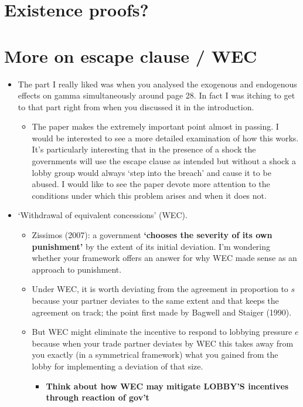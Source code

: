 \documentclass[12pt]{article}
\begin{document}
\section{Existence proofs?}


\section{More on escape clause / WEC}
		\begin{itemize}
			\item The part I really liked was when you analysed the exogenous and endogenous effects on gamma simultaneously around page 28.  In fact I was itching to get to that part right from when you discussed it in the introduction.  
				\begin{itemize}
					\item The paper makes the extremely important point almost in passing.  I would be interested to see a more detailed examination of how this works.  It's particularly interesting that in the presence of a shock the governments will use the escape clause as intended but without a shock a lobby group would always `step into the breach' and cause it to be abused.  I would like to see the paper devote more attention to the conditions under which this problem arises and when it does not.
				\end{itemize}
			\item `Withdrawal of equivalent concessions' (WEC).
				\begin{itemize}
					\item Zissimos (2007): a government \textbf{`chooses the severity of its own punishment'} by the extent of its initial deviation. I'm wondering whether your framework offers an answer for why WEC made sense as an approach to punishment.
					\item Under WEC, it is worth deviating from the agreement in proportion to $s$ because your partner deviates to the same extent and that keeps the agreement on track; the point first made by Bagwell and Staiger (1990).
					\item But WEC might eliminate the incentive to respond to lobbying pressure $e$ because when your trade partner deviates by WEC this takes away from you exactly (in a symmetrical framework) what you gained from the lobby for implementing a deviation of that size.
						\begin{itemize}
							\item \textbf{Think about how WEC may mitigate LOBBY'S incentives through reaction of gov't}

\end{itemize}
\end{itemize}
\end{itemize}
\end{document}
